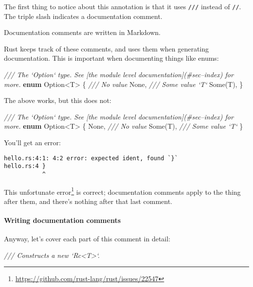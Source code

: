 \documentclass[a4paper,]{book}
\newenvironment{Shaded}{\begin{snugshade}}{\end{snugshade}}
\newcommand{\KeywordTok}[1]{\textcolor[rgb]{0.13,0.29,0.53}{\textbf{{#1}}}}
\newcommand{\DataTypeTok}[1]{\textcolor[rgb]{0.13,0.29,0.53}{{#1}}}
\newcommand{\ConstantTok}[1]{\textcolor[rgb]{0.00,0.00,0.00}{{#1}}}
\newcommand{\CommentTok}[1]{\textcolor[rgb]{0.56,0.35,0.01}{\textit{{#1}}}}
\newcommand{\NormalTok}[1]{{#1}}
\renewcommand{\href}[2]{#2\footnote{\url{#1}}}
\let\oldparagraph\paragraph
\renewcommand{\paragraph}[1]{\oldparagraph{#1}\mbox{}}
\begin{document}
The first thing to notice about this annotation is that it uses
\texttt{///} instead of \texttt{//}. The triple slash indicates a
documentation comment.

Documentation comments are written in Markdown.

Rust keeps track of these comments, and uses them when generating
documentation. This is important when documenting things like enums:

\begin{Shaded}
\begin{Highlighting}[]
\CommentTok{/// The `Option` type. See [the module level documentation](#sec--index) for more.}
\KeywordTok{enum} \DataTypeTok{Option}\NormalTok{<T> \{}
    \CommentTok{/// No value}
    \ConstantTok{None}\NormalTok{,}
    \CommentTok{/// Some value `T`}
    \ConstantTok{Some}\NormalTok{(T),}
\NormalTok{\}}
\end{Highlighting}
\end{Shaded}

The above works, but this does not:

\begin{Shaded}
\begin{Highlighting}[]
\CommentTok{/// The `Option` type. See [the module level documentation](#sec--index) for more.}
\KeywordTok{enum} \DataTypeTok{Option}\NormalTok{<T> \{}
    \ConstantTok{None}\NormalTok{, }\CommentTok{/// No value}
    \ConstantTok{Some}\NormalTok{(T), }\CommentTok{/// Some value `T`}
\NormalTok{\}}
\end{Highlighting}
\end{Shaded}

You'll get an error:

\begin{verbatim}
hello.rs:4:1: 4:2 error: expected ident, found `}`
hello.rs:4 }
           ^
\end{verbatim}

This \href{https://github.com/rust-lang/rust/issues/22547}{unfortunate
error} is correct; documentation comments apply to the thing after them,
and there's nothing after that last comment.

\paragraph{Writing documentation
comments}\label{writing-documentation-comments}

Anyway, let's cover each part of this comment in detail:

\begin{Shaded}
\begin{Highlighting}[]
\CommentTok{/// Constructs a new `Rc<T>`.}
\end{Highlighting}
\end{Shaded}
\end{document}
